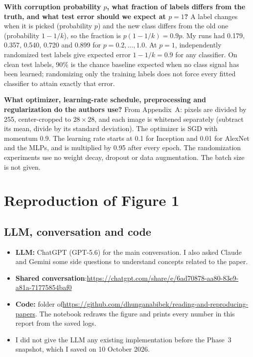 \textbf{With corruption probability $p$, what fraction of labels differs from the truth, and what test error should we expect at $p=1$?} A label changes when it is picked (probability $p$) and the new class differs from the old one (probability $1-1/k$), so the fraction is $p(1-1/k)=0.9p$. My runs had 0.179, 0.357, 0.540, 0.720 and 0.899 for $p=0.2,\dots,1.0$. At $p=1$, independently randomized test labels give expected error $1-1/k=0.9$ for any classifier. On clean test labels, 90\% is the chance baseline expected when no class signal has been learned; randomizing only the training labels does not force every fitted classifier to attain exactly that error.

\textbf{What optimizer, learning-rate schedule, preprocessing and regularization do the authors use?} From Appendix~A: pixels are divided by 255, center-cropped to $28\times28$, and each image is whitened separately (subtract its mean, divide by its standard deviation). The optimizer is SGD with momentum 0.9. The learning rate starts at 0.1 for Inception and 0.01 for AlexNet and the MLPs, and is multiplied by 0.95 after every epoch. The randomization experiments use no weight decay, dropout or data augmentation. The batch size is not given.

\section{Reproduction of Figure 1}

\subsection{LLM, conversation and code}
\begin{itemize}
  \item \textbf{LLM:} ChatGPT (GPT-5.6) for the main conversation. I also asked Claude and Gemini some side questions to understand concepts related to the paper.
  \item \textbf{Shared conversation}:\newline \url{https://chatgpt.com/share/e/6ad70878-aa80-83e9-a81a-71775854baf0}
  \item \textbf{Code:} folder  of\newline \url{https://github.com/dhunganabibek/reading-and-reproducing-papers}. The notebook  redraws the figure and prints every number in this report from the saved logs.
  \item I did not give the LLM any existing implementation before the Phase~3 snapshot, which I saved on 10 October 2026.
\end{itemize}

